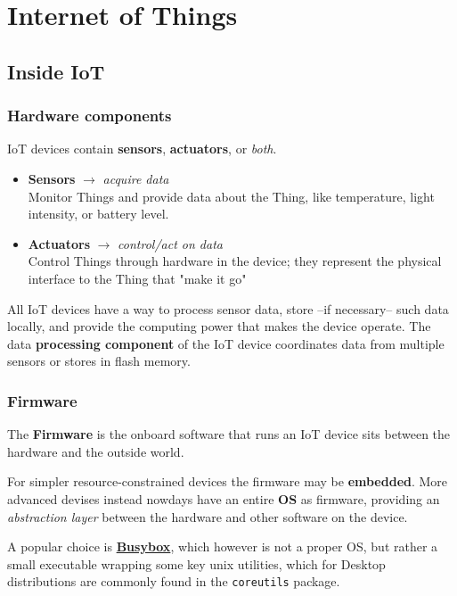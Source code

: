 \chapter{Internet of Things}

\section{Inside IoT}
\subsection{Hardware components}
IoT devices contain \textbf{sensors}, \textbf{actuators}, or \textit{both}.
\begin{itemize}
   \item \textbf{Sensors} $\longrightarrow$ \textit{acquire data}\\
   Monitor Things and provide data about the Thing, like temperature, light intensity, or battery level.
   \item \textbf{Actuators} $\longrightarrow$ \textit{control/act on data}\\
   Control Things through hardware in the device;
   they represent the physical
   interface to the Thing that "make it go"
\end{itemize}

All IoT devices have a way to process sensor data, store {--}if necessary{--} such data locally, and provide the computing power that makes the device
operate.
The data \textbf{processing component} of the IoT device coordinates data from multiple sensors or stores in flash memory.

\subsection{Firmware}
The \textbf{Firmware} is the onboard software that runs an IoT device sits between the
hardware and the outside world.

For simpler resource-constrained devices the firmware may be \textbf{embedded}.
More advanced devises instead nowdays have an entire \textbf{OS} as firmware, providing an
\textit{abstraction layer} between the hardware and other software on the device.

A popular choice is \href{https://busybox.net/}{\textbf{Busybox}}, which however is not a proper OS, but rather a small executable wrapping some key unix utilities, which for Desktop distributions are commonly found in the \texttt{coreutils} package.

